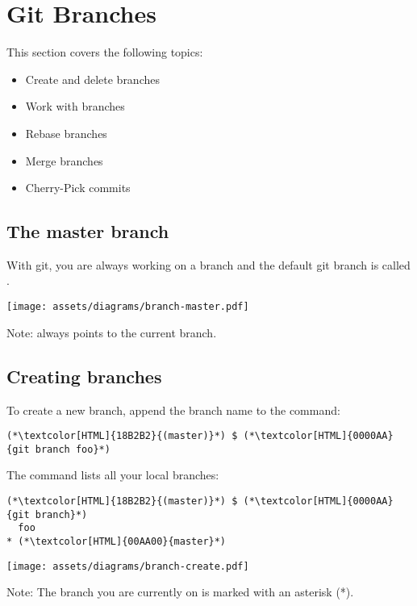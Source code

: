 \section{Git Branches}
\begin{frame}[fragile]
  \slidetitle

  This section covers the following topics:
  \begin{itemize}
    \item Create and delete branches
    \item Work with branches
    \item Rebase branches
    \item Merge branches
    \item Cherry-Pick commits
  \end{itemize}
\end{frame}

\subsection{The master branch}
\begin{frame}[fragile]
  \subslidetitle

  With git, you are always working on a branch and the default git branch is called .
  \newline \vspace{1em}
  \centerline{\texttt{[image: assets/diagrams/branch-master.pdf]}}

  \vspace{1.2em}
  Note:  always points to the current branch.

\end{frame}

\subsection{Creating branches}
\begin{frame}[fragile]
  \subslidetitle

  To create a new  branch, append the branch name to the  command:
  \begin{lstlisting}
(*\textcolor[HTML]{18B2B2}{(master)}*) $ (*\textcolor[HTML]{0000AA}{git branch foo}*)
\end{lstlisting}

  The  command lists all your local branches:
  \begin{lstlisting}
(*\textcolor[HTML]{18B2B2}{(master)}*) $ (*\textcolor[HTML]{0000AA}{git branch}*)
  foo
* (*\textcolor[HTML]{00AA00}{master}*)
\end{lstlisting}
  \vspace{1em}
  \centerline{\texttt{[image: assets/diagrams/branch-create.pdf]}}
  \vspace{1em}
  Note: The branch you are currently on is marked with an asterisk (*).
\end{frame}


